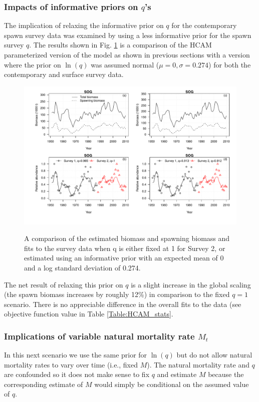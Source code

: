 		\subsubsection{Impacts of informative priors on $q$'s}
The implication of relaxing the informative prior on $q$ for the contemporary spawn survey data was examined by using a less informative prior for the spawn survey $q$. The results shown in Fig. \ref{fig:qFix_qPrior} is a comparison of the HCAM parameterized version of the model as shown in previous sections with a version where the prior on $\ln(q)$ was assumed normal ($\mu=0, \sigma = 0.274$) for both the contemporary and surface survey data.
\begin{figure}[!tbp]
	\includegraphics[width=\textwidth]{../FIGS/iscam_fig_HCAM_qFix_qPrior.pdf}\\
	\caption{A comparison of the estimated biomass and spawning biomass and fits to the survey data when q is either fixed at 1 for Survey 2, or  estimated using an informative prior with an expected mean of 0 and a log standard deviation of 0.274.}\label{fig:qFix_qPrior}
\end{figure}

The net result of relaxing this prior on $q$ is a slight increase in the global scaling (the spawn biomass increases by roughly 12\%) in comparison to the fixed $q=1$ scenario.  There is no appreciable difference in the overall fits to the data (see objective function value in Table \ref{Table:HCAM_stats}.
		
		\subsubsection{Implications of variable natural mortality rate $M_t$}
	In this next scenario we use the same prior for $\ln(q)$ but do not allow natural mortality rates to vary over time (i.e., fixed $M$).  The natural mortality rate and $q$ are confounded so it does not make sense to fix $q$ and estimate $M$ because the corresponding estimate of $M$ would simply be conditional on the assumed value of $q$.
	
